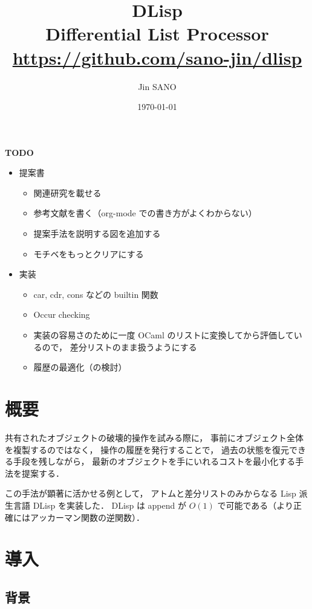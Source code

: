 \documentclass[10pt, a4j, twocolumn]{scrartcl}
\author{Jin SANO}
\date{\today}
\title{DLisp\\\medskip
\large Differential List Processor \\ \url{https://github.com/sano-jin/dlisp}}
\begin{document}
\maketitle
\tableofcontents

\vspace{1em}

\textbf{\textbf{TODO}} 

\begin{itemize}
\item 提案書
\begin{itemize}
\item 関連研究を載せる
\item 参考文献を書く（org-mode での書き方がよくわからない）
\item 提案手法を説明する図を追加する
\item モチベをもっとクリアにする
\end{itemize}

\item 実装
\begin{itemize}
\item car, cdr, cons などの builtin 関数
\item Occur checking
\item 実装の容易さのために一度 OCaml のリストに変換してから評価しているので，
差分リストのまま扱うようにする
\item 履歴の最適化（の検討）
\end{itemize}
\end{itemize}


\section{概要}
\label{sec:orgc25a420}

共有されたオブジェクトの破壊的操作を試みる際に，
事前にオブジェクト全体を複製するのではなく，
操作の履歴を発行することで，
過去の状態を復元できる手段を残しながら，
最新のオブジェクトを手にいれるコストを最小化する手法を提案する．

この手法が顕著に活かせる例として，
アトムと差分リストのみからなる Lisp 派生言語 DLisp を実装した．
DLisp は append が \(O(1)\) で可能である（より正確にはアッカーマン関数の逆関数）．


\section{導入}
\label{sec:org977ae10}

\subsection{背景}
\label{sec:org672b863}
\end{document}
